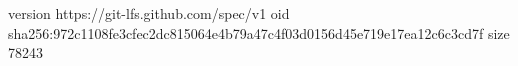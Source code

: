 version https://git-lfs.github.com/spec/v1
oid sha256:972c1108fe3cfec2dc815064e4b79a47c4f03d0156d45e719e17ea12c6c3cd7f
size 78243
